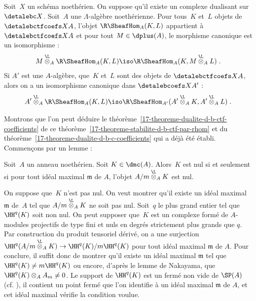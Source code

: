 \documentclass[10pt]{../fichiers-configuration-latex/smfart}
\begin{document}
\begin{theoreme2}\label{17-theoreme-stabilite-d-b-ctf-par-rhom}
Soit $X$ un schéma noethérien. On suppose qu'il existe un complexe
dualisant sur $\detalebc X$. Soit $A$ une $\Lambda$-algèbre noethérienne.
Pour tous $K$ et $L$ objets de $\detalebctfcoefs X A$, l'objet
$\R\SheafHom_A(K,L)$ appartient à $\detalebctfcoefs X A$ et pour tout
$M\in\dplus(A)$, le morphisme canonique est un isomorphisme :
\[M\overset{\L}\otimes_A \R\SheafHom_A(K,L)\iso
\R\SheafHom_A(K,M\overset{\L}\otimes_A L)\;\text{.}\]
Si $A'$ est une $A$-algèbre,
que $K$ et $L$ sont des objets de
$\detalebctfcoefs X A$, alors on a un isomorphisme canonique dans
$\detalebcoefs X
{A'}$ :
\[A'\overset{\L}\otimes_A\R\SheafHom_A(K,L)\iso
\R\SheafHom_{A'}(A'\overset{\L}\otimes_A K,
A'\overset{\L}\otimes_A L)\;\text{.}\]
\end{theoreme2}

Montrons que l'on peut déduire le
théorème~\ref{17-theoreme-dualite-d-b-ctf-coefficients} de 
ce théorème~\ref{17-theoreme-stabilite-d-b-ctf-par-rhom} et du
théorème~\ref{17-theoreme-dualite-d-b-c-coefficients} qui a déjà été établi.
Commençons par un lemme :

\begin{lemme2}
Soit $A$ un anneau noethérien. Soit $K\in\dmc(A)$.
Alors $K$ est nul si et seulement si pour 
tout idéal maximal $\mathfrak m$ de $A$, l'objet
$A/\mathfrak m\overset{\L}\otimes_A K$ est nul. 
\end{lemme2}

On suppose que $K$ n'est pas nul. On veut montrer qu'il existe un idéal
maximal $\mathfrak m$ de $A$ tel que $A/\mathfrak
m\overset{\L}\otimes_A K$ ne soit pas nul.
Soit $q$ le plus grand entier tel que
$\HH^q(K)$ soit non nul. On peut supposer que $K$ est un complexe formé de
$A$-modules projectifs de type fini et nuls en degrés strictement plus
grands que $q$. Par construction du produit tensoriel dérivé, on a une
surjection $\HH^q(A/\mathfrak m\overset{\L}\otimes_A K)\to
\HH^q(K)/\mathfrak m \HH^q(K)$ pour tout idéal maximal $\mathfrak m$ de $A$. 
Pour conclure, il suffit donc de montrer qu'il existe un idéal maximal
$\mathfrak m$ tel que $\HH^q(K)\neq \mathfrak m \HH^q(K)$ ou encore, d'après le
lemme de Nakayama, que $\HH^q(K)\otimes_A A_{\mathfrak m}\neq 0$. Le support
de $\HH^q(K)$ est un fermé non vide de $\SP(A)$ (cf.
), il contient un point fermé que l'on
identifie à un idéal maximal $\mathfrak m$ de $A$,
et cet idéal maximal vérifie la condition voulue.
\end{document}
